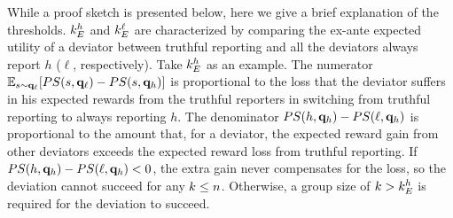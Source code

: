 While a proof sketch is presented below, here we give a brief explanation of the thresholds. $k_E^h$ and $k_E^\ell$ are characterized by comparing the ex-ante expected utility of a deviator between truthful reporting and all the deviators always report $h$ ($\ell$, respectively). Take $k_E^h$ as an example. The numerator  $\mathbb{E}_{s\sim \mathbf{q}_{\ell}}[PS(s, \mathbf{q}_{\ell}) - PS(s, \mathbf{q}_{h})]$ is proportional to the loss that the deviator suffers in his expected rewards from the truthful reporters in switching from truthful reporting to always reporting $h$. The denominator $PS(h, \mathbf{q}_h) - PS(\ell, \mathbf{q}_h)$ is proportional to the amount that, for a deviator, the expected reward gain from other deviators exceeds the expected reward loss from truthful reporting. If $PS(h, \mathbf{q}_h) - PS(\ell, \mathbf{q}_h) < 0$, the extra gain never compensates for the loss, so the deviation cannot succeed for any $k \le n$. Otherwise, a group size of $k > k_E^h$ is required for the deviation to succeed.



